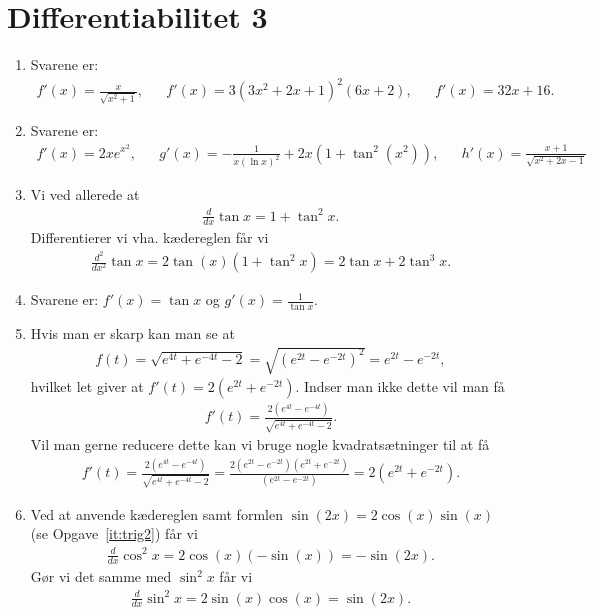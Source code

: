 \newpage 
\section{Differentiabilitet 3}
\begin{enumerate}
			
	\item Svarene er:
	\begin{align*}
	f'(x)=\frac{x}{\sqrt{x^2+1}},&&f'(x)=3(3x^2+2x+1)^2(6x+2),&&f'(x)=32x+16.
	\end{align*}
	
	\item Svarene er:
	\begin{align*}
	f'(x)=2xe^{x^2},&& g'(x)=-\frac{1}{x(\ln x)^2}+2x(1+\tan^2(x^2)),&&h'(x)=\frac{x+1}{\sqrt{x^2+2x-1}}
	\end{align*}
	
	\item Vi ved allerede at
	\begin{align*}
	\frac{d}{dx} \tan x=1+\tan^2 x.
	\end{align*}
	Differentierer vi vha. kædereglen får vi
	\begin{align*}
	\frac{d^2}{dx^2}\tan x=2\tan(x)(1+\tan^2 x)=2\tan x+2\tan^3x.
	\end{align*}
	
	\item Svarene er: $f'(x)=\tan x$ og $g'(x)=\frac{1}{\tan x}$.
	
	\item Hvis man er skarp kan man se at
	\begin{align*}
	f(t)=\sqrt{e^{4t}+e^{-4t}-2}=\sqrt{(e^{2t}-e^{-2t})^2}=e^{2t}-e^{-2t},
	\end{align*}
	hvilket let giver at $f'(t)=2(e^{2t}+e^{-2t})$. Indser man ikke dette vil man få
	\begin{align*}
	f'(t)=\frac{2(e^{4t}-e^{-4t})}{\sqrt{e^{4t}+e^{-4t}-2}}.
	\end{align*}
	Vil man gerne reducere dette kan vi bruge nogle kvadratsætninger til at få
	\begin{align*}
	f'(t)=\frac{2(e^{4t}-e^{-4t})}{\sqrt{e^{4t}+e^{-4t}-2}}=\frac{2(e^{2t}-e^{-2t})(e^{2t}+e^{-2t})}{(e^{2t}-e^{-2t})}=2(e^{2t}+e^{-2t}).
	\end{align*}
	
	\item Ved at anvende kædereglen samt formlen $\sin(2x)=2\cos(x)\sin(x)$ (se Opgave~\ref{it:trig2}) får vi
	\begin{align*}
	\frac{d}{dx}\cos^2x=2\cos(x)(-\sin(x))=-\sin(2x).
	\end{align*}
	Gør vi det samme med $\sin^2x$ får vi
	\begin{align*}
	\frac{d}{dx}\sin^2x=2\sin(x)\cos(x)=\sin(2x).
	\end{align*}
	

\end{enumerate}
